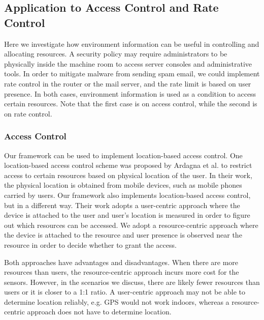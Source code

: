\subsection{Application to Access Control and Rate Control}
\label{sec:app-ac-rate}

Here we investigate how environment information can be useful in
controlling and allocating resources.  A security policy may require
administrators to be physically inside the machine room to access
server consoles and administrative tools. In order to mitigate
malware from sending spam email, we could implement rate control in
the router or the mail server, and the rate limit is based on user
presence. In both cases, environment information is used as a
condition to access certain resources. Note that the first case is
on access control, while the second is on rate control.

\subsubsection{Access Control}
\label{sec:app-ac}

Our framework can be used to implement location-based access
control. One location-based access control scheme was proposed by Ardagna et
al. \cite{locaccess} to restrict access to certain resources based on
physical location of the user. In their work, the physical location
is obtained from mobile devices, such as mobile phones carried by
users. Our framework also implements location-based access
control, but in a different way. Their work adopts a user-centric
approach where the device is attached to the user and
user's location is measured in order to figure out
which resources can be accessed.
We adopt a resource-centric approach where the device is attached to
the resource and user presence is observed near the resource in order
to decide whether to grant the access.

Both approaches have advantages and disadvantages.
When there are more resources than users, the resource-centric approach
incurs more cost for the sensors.
However, in the scenarios we discuss, there are likely fewer resources
than users or it is closer to a 1:1 ratio.
A user-centric approach may not be able to determine location
reliably, e.g. GPS would not work indoors,
whereas a resource-centric approach does not have to determine location.

